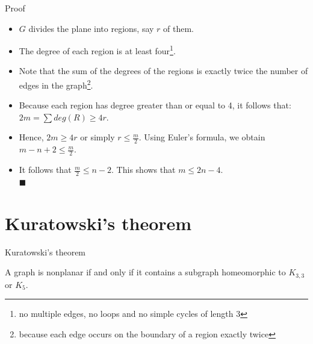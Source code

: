 \documentclass{beamer}
\theoremstyle{definition}
\begin{document}
\begin{frame}{Proof}
    \begin{itemize}[<+->]
        \item $G$ divides the plane into regions, say $r$ of them.
        \item The degree of each region is at least four\footnote{{\tiny no multiple edges, no loops and no simple cycles of length 3}}.
        \item Note that the sum of the degrees of the regions is exactly twice the number of edges in the graph\footnote{{\tiny because each edge occurs on the boundary of a region exactly twice}}.
        \item Because each region has degree greater than or equal to 4, it follows that: $ 2m = \sum deg(R) \geq 4r $.
        \item Hence, $2m \geq 4r$ or simply $r \leq \frac{m}{2}$. Using Euler's formula, we obtain $m - n + 2 \leq \frac{m}{2}$.
        \item It follows that $\frac{m}{2} \leq n - 2$. This shows that $m \leq 2n - 4$. \\ \hspace{10.5cm} {\tiny $\blacksquare$}
    \end{itemize}
\end{frame}

\section{Kuratowski's theorem}

\begin{frame}{Kuratowski's theorem}
    \begin{theorem}
        A graph is nonplanar if and only if it contains a subgraph homeomorphic to $K_{3,3}$ or $K_5$.
    \end{theorem}
    \begin{figure}
    \end{figure}
\end{frame}
\end{document}
